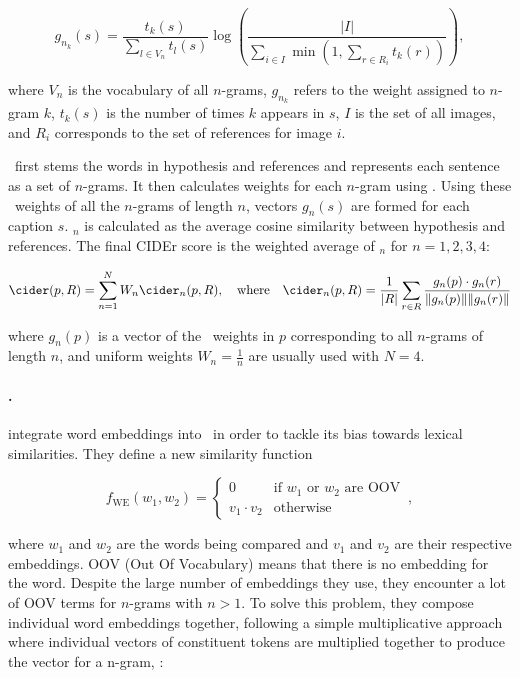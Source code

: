 \[ g_{n_k} (s) = \frac{t_k(s)}{\sum_{l \in V_n} t_l(s)} \log \left( \frac{|I|}{\sum_{i \in I} \min\left(1, \sum_{r \in R_i} t_k(r) \right)} \right) , \]

where $V_n$ is the vocabulary of all $n$-grams, $g_{n_k}$ refers to the weight assigned to $n$-gram $k$, $t_k(s)$ is the number of times $k$ appears in $s$, $I$ is the set of all images, and $R_i$ corresponds to the set of references for image $i$.

\cider\ first stems the words in hypothesis and references and represents each sentence as a set of $n$-grams. It then calculates weights for each $n$-gram using \tfidf. Using these \tfidf\ weights of all the $n$-grams of length $n$, vectors $g_n(s)$ are formed for each caption $s$. \cider$_n$ is calculated as the average cosine similarity between hypothesis and references. The final CIDEr score is the weighted average of \cider$_n$ for $n = 1, 2, 3, 4$:

\[ \cider (p, R) = \sum_{n=1}^N W_n \cider_n (p,R), \quad \text{where} \quad \cider_n(p,R) = \frac{1}{|R|} \sum_{r \in R} \frac{g_n(p) \cdot g_n(r)}{\| g_n(p)\| \|g_n(r)\|} \]

where $g_n(p)$ is a vector of the \tfidf\ weights in $p$ corresponding to all $n$-grams of length $n$, and uniform weights $W_n = \frac{1}{n}$ are usually used with $N = 4$.

\paragraph{\rougewe.}
\citet{ng2015better} integrate word embeddings into \rouge\ in order to tackle its bias towards lexical similarities. They define a new similarity function 

\[ f_\textrm{WE}(w_1, w_2) = 
    \begin{cases}
        0 & \text{if } w_1 \text{ or } w_2 \text{ are OOV} \\
        v_1 \cdot v_2 & \text{otherwise}
    \end{cases}
    \, ,\]

where $w_1$ and $w_2$ are the words being compared and $v_1$ and $v_2$ are their respective embeddings. OOV (Out Of Vocabulary) means that there is no embedding for the word. Despite the large number of embeddings they use, they encounter a lot of OOV terms for $n$-grams with $n>1$. To solve this problem, they compose individual word embeddings together, following a simple multiplicative approach where individual vectors of constituent tokens are multiplied together to produce the vector for a n-gram, \ie:

